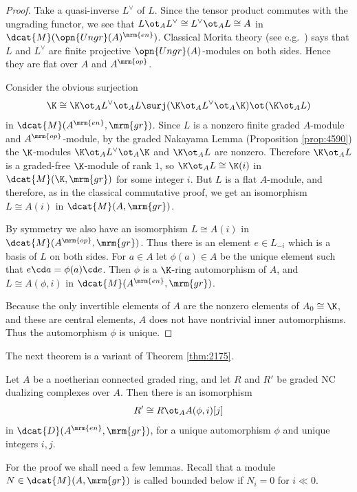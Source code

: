 \begin{proof}
Take a quasi-inverse $L^{\vee}$ of $L$. 
Since the tensor product commutes with the ungrading functor, we see that 
$L \ot_A L^{\vee} \cong L^{\vee} \ot_A L \cong A$ 
in $\dcat{M}(\opn{Ungr}(A)^{\mrm{en}})$. Classical Morita theory (see 
e.g.\ \cite[Chapter 4]{Row}) says that $L$ 
and $L^{\vee}$ are finite projective $\opn{Ungr}(A)$-modules on both sides. 
Hence they are flat over $A$ and $A^{\mrm{op}}$. 

Consider the obvious surjection 
\[ \K \cong \K \ot_A L^{\vee} \ot_A L \surj 
(\K \ot_A L^{\vee} \ot_{A} \K) \ot_{} (\K \ot_A L)  \]
in $\dcat{M}(A^{\mrm{en}}, \mrm{gr})$.
Since $L$ is a nonzero finite graded $A$-module and $A^{\mrm{op}}$-module, by 
the graded Nakayama Lemma (Proposition \ref{prop:4590}) the $\K$-modules  
$\K \ot_A L^{\vee} \ot_{A} \K$ and $\K \ot_A L$ are 
nonzero. Therefore $\K \ot_A L$ is a graded-free $\K$-module of rank $1$, so  
$\K \ot_A L \cong \K(i)$ in $\dcat{M}(\K, \mrm{gr})$ for some 
integer $i$. But $L$ is a flat $A$-module, and therefore, as in the classical 
commutative proof, we get an isomorphism
$L \cong A(i)$ in $\dcat{M}(A, \mrm{gr})$. 

By symmetry we also have an isomorphism 
$L \cong A(i)$ in $\dcat{M}(A^{\mrm{op}}, \mrm{gr})$.
Thus there is an element $e \in L_{-i}$ which is a basis of $L$ on both sides. 
For $a \in A$ let $\phi(a) \in A$ be the unique element such that 
$e \cd a = \phi(a) \cd e$. Then $\phi$ is a $\K$-ring automorphism of $A$, and 
$L \cong  A(\phi, i)$ in $\dcat{M}(A^{\mrm{en}}, \mrm{gr})$.

Because the only invertible elements of $A$ are the nonzero elements of 
$A_0 \cong \K$, and these are central elements, $A$ does not have nontrivial 
inner automorphisms. Thus the automorphism $\phi$ is unique. 
\end{proof}

The next theorem is a variant of Theorem \ref{thm:2175}. 

\begin{thm} \label{thm:3780} 
Let $A$ be a noetherian connected graded ring, and let  $R$ and $R'$ be graded 
NC dualizing complexes over $A$. Then there is an isomorphism
\[ R' \cong R \ot_A A(\phi, i)[j] \]
in $\dcat{D}(A^{\mrm{en}}, \mrm{gr})$, for a unique automorphism $\phi$ and 
unique integers $i, j$. 
\end{thm}

For the proof we shall need a few lemmas. 
Recall that a module $N \in \dcat{M}(A, \mrm{gr})$ is called bounded below 
if $N_i = 0$ for $i \ll 0$. 

